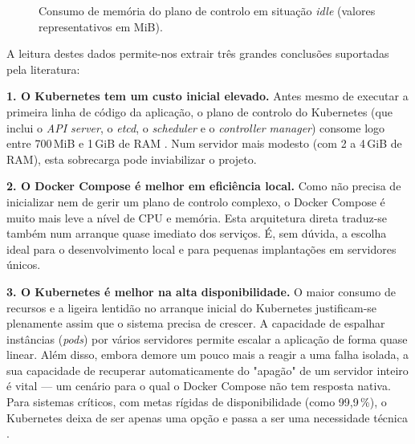 \documentclass[conference]{IEEEtran}
\begin{document}
\begin{figure}[t]
\centering
{}
\caption{Consumo de memória do plano de controlo em situação \textit{idle} (valores representativos em MiB).}
\label{fig:overhead}
\end{figure}

A leitura destes dados permite-nos extrair três grandes conclusões suportadas pela literatura:

\textbf{1. O Kubernetes tem um custo inicial elevado.} Antes mesmo de executar a primeira linha de código da aplicação, o plano de controlo do Kubernetes (que inclui o \textit{API server}, o \textit{etcd}, o \textit{scheduler} e o \textit{controller manager}) consome logo entre 700\,MiB e 1\,GiB de RAM \cite{k8sdocs}. Num servidor mais modesto (com 2 a 4\,GiB de RAM), esta sobrecarga pode inviabilizar o projeto.

\textbf{2. O Docker Compose é melhor em eficiência local.} Como não precisa de inicializar nem de gerir um plano de controlo complexo, o Docker Compose é muito mais leve a nível de CPU e memória. Esta arquitetura direta traduz-se também num arranque quase imediato dos serviços. É, sem dúvida, a escolha ideal para o desenvolvimento local e para pequenas implantações em servidores únicos.

\textbf{3. O Kubernetes é melhor na alta disponibilidade.} O maior consumo de recursos e a ligeira lentidão no arranque inicial do Kubernetes justificam-se plenamente assim que o sistema precisa de crescer. A capacidade de espalhar instâncias (\textit{pods}) por vários servidores permite escalar a aplicação de forma quase linear. Além disso, embora demore um pouco mais a reagir a uma falha isolada, a sua capacidade de recuperar automaticamente do "apagão" de um servidor inteiro é vital — um cenário para o qual o Docker Compose não tem resposta nativa. Para sistemas críticos, com metas rígidas de disponibilidade (como 99,9\,\%), o Kubernetes deixa de ser apenas uma opção e passa a ser uma necessidade técnica \cite{burns2016}.
\end{document}
